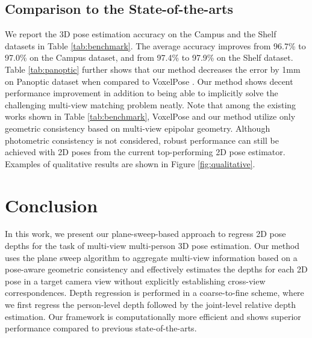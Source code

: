 \documentclass[final]{cvpr}
\begin{document}
\subsection{Comparison to the State-of-the-arts}

We report the 3D pose estimation accuracy on the Campus and the Shelf datasets in Table \ref{tab:benchmark}.
The average accuracy improves from 96.7\% to 97.0\% on the Campus dataset, and from 97.4\% to 97.9\% on the Shelf dataset.
Table \ref{tab:panoptic} further shows that our method decreases the error by 1mm on Panoptic dataset when compared to VoxelPose \cite{tu2020voxelpose}.
Our method shows decent performance improvement in addition to being able to implicitly solve the challenging multi-view matching problem neatly.
Note that among the existing works shown in Table \ref{tab:benchmark}, VoxelPose \cite{tu2020voxelpose} and our method utilize only geometric consistency based on multi-view epipolar geometry.
Although photometric consistency is not considered, robust performance can still be achieved with 2D poses from the current top-performing 2D pose estimator.
Examples of qualitative results are shown in Figure \ref{fig:qualitative}.


\section{Conclusion}

In this work, we present our plane-sweep-based approach to regress 2D pose depths for the task of multi-view multi-person 3D pose estimation.
Our method uses the plane sweep algorithm to aggregate multi-view information based on a pose-aware geometric consistency and effectively estimates the depths for each 2D pose in a target camera view without explicitly establishing cross-view correspondences.
Depth regression is performed in a coarse-to-fine scheme, where we first regress the person-level depth followed by the joint-level relative depth estimation.
Our framework is computationally more efficient and shows superior performance compared to previous state-of-the-arts.



\clearpage

{\small


}
\end{document}
